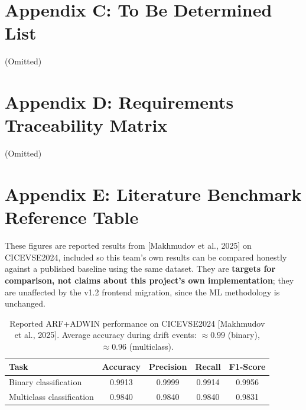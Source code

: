 \documentclass[11pt, a4paper]{article}
\begin{document}
\section{Appendix C: To Be Determined List}
(Omitted)

\section{Appendix D: Requirements Traceability Matrix}
(Omitted)

\section{Appendix E: Literature Benchmark Reference Table}
These figures are reported results from [Makhmudov et al., 2025] on CICEVSE2024, included so this team's own results can be compared honestly against a published baseline using the same dataset. They are \textbf{targets for comparison, not claims about this project's own implementation}; they are unaffected by the v1.2 frontend migration, since the ML methodology is unchanged.

\begin{table}[h]
\centering
\begin{tabular}{|l|c|c|c|c|}
\hline
\textbf{Task} & \textbf{Accuracy} & \textbf{Precision} & \textbf{Recall} & \textbf{F1-Score} \\ \hline
Binary classification & 0.9913 & 0.9999 & 0.9914 & 0.9956 \\ \hline
Multiclass classification & 0.9840 & 0.9840 & 0.9840 & 0.9831 \\ \hline
\end{tabular}
\caption{Reported ARF+ADWIN performance on CICEVSE2024 [Makhmudov et al., 2025]. Average accuracy during drift events: $\approx 0.99$ (binary), $\approx 0.96$ (multiclass).}
\end{table}
\end{document}
